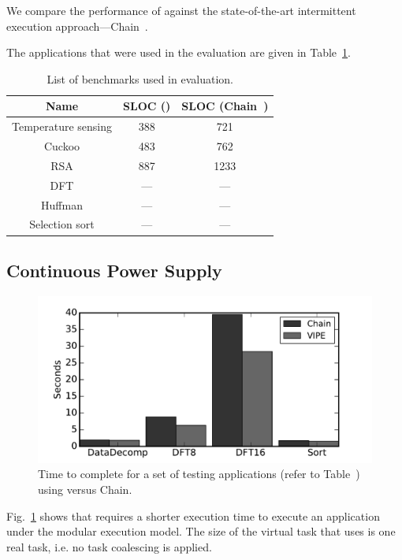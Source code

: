We compare the performance of \sys against the state-of-the-art intermittent execution approach---Chain~\cite{chain}.

The applications that were used in the evaluation are given in Table~\ref{table:benchmark_list}.

\begin{table}
	\begin{tabular}{|c|c|c|}
		\hline
		Name & SLOC (\sys) & SLOC (Chain~\cite{chain})\\
		\hline\hline
		Temperature sensing & 388 & 721 \\ %
		Cuckoo & 483 & 762 \\ %
		RSA & 887 & 1233 \\ %
		DFT & --- & --- \\ %
		Huffman & --- & --- \\ %
		Selection sort & --- & --- \\
		\hline
	\end{tabular}
\caption{List of benchmarks used in \sys evaluation.}
\label{table:benchmark_list}
\end{table}

\subsection{Continuous Power Supply}
\label{sec:results_continuous_power}

\begin{figure}
	\centering
	\includegraphics[width=\columnwidth]{figures/chain_vipe}
	\caption{Time to complete for a set of testing applications (refer to Table~\cite{table:benchmark_list}) using \sys versus Chain.}
	\label{fig:IPOSPerformance}
\end{figure}

Fig.~\ref{fig:IPOSPerformance} shows that \sys requires a shorter execution time to execute an application under the modular execution model. The size of the virtual task that \sys uses is one real task, i.e. no task coalescing is applied.

